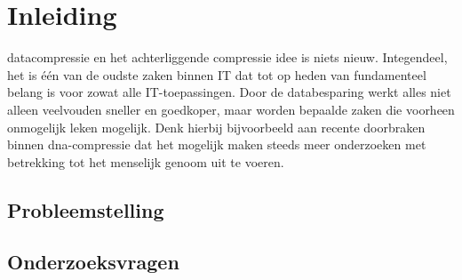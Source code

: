 
\chapter{Inleiding}
\label{ch:inleiding}

\Gls{datacompressie} en het achterliggende compressie idee is niets nieuw. Integendeel, het is één van de oudste zaken binnen IT dat tot op heden van fundamenteel belang is voor zowat alle IT-toepassingen. Door de databesparing werkt alles niet alleen veelvouden sneller en goedkoper, maar worden bepaalde zaken die voorheen onmogelijk leken mogelijk. Denk hierbij bijvoorbeeld aan recente doorbraken binnen \gls{dna-compressie} dat het mogelijk maken steeds meer onderzoeken met betrekking tot het menselijk genoom uit te voeren.



\section{Probleemstelling}
\label{sec:probleemstelling}



\section{Onderzoeksvragen}
\label{sec:onderzoeksvragen}


